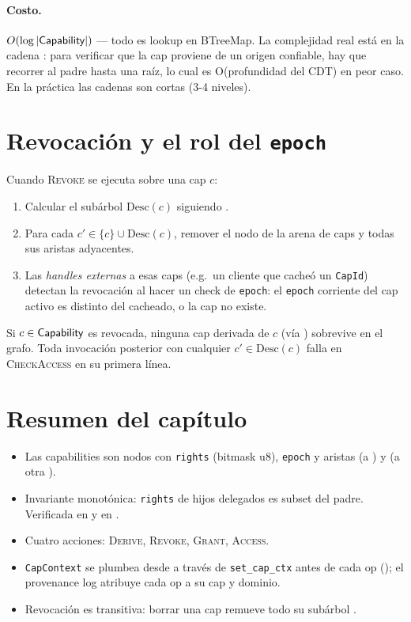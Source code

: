 \paragraph{Costo.} $O(\log |\textsf{Capability}|)$ — todo es lookup en BTreeMap. La
complejidad real está en la cadena \edelegates: para verificar que la
cap proviene de un origen confiable, hay que recorrer al padre hasta una
raíz, lo cual es O(profundidad del CDT) en peor caso. En la práctica
las cadenas son cortas (3-4 niveles).

\section{Revocación y el rol del \texttt{epoch}}

Cuando \textsc{Revoke} se ejecuta sobre una cap $c$:

\begin{enumerate}
  \item Calcular el subárbol $\mathrm{Desc}(c)$ siguiendo \edelegates.
  \item Para cada $c' \in \{c\} \cup \mathrm{Desc}(c)$, remover el nodo
    de la arena de caps y todas sus aristas adyacentes.
  \item Las \emph{handles externas} a esas caps (e.g.\ un cliente que
    cacheó un \texttt{CapId}) detectan la revocación al hacer un check
    de \texttt{epoch}: el \texttt{epoch} corriente del cap activo es
    distinto del cacheado, o la cap no existe.
\end{enumerate}

\begin{lema}
\label{lem:revoke-transitivo}
Si $c \in \textsf{Capability}$ es revocada, ninguna cap derivada de $c$ (vía
\edelegates) sobrevive en el grafo. Toda invocación posterior con
cualquier $c' \in \mathrm{Desc}(c)$ falla en \textsc{CheckAccess} en su
primera línea.
\end{lema}

\section*{Resumen del capítulo}

\begin{itemize}
  \item Las capabilities son nodos \NCap{} con \texttt{rights} (bitmask
    u8), \texttt{epoch} y aristas \egrants{} (a \NInode) y \edelegates{}
    (a otra \NCap).
  \item Invariante monotónica: \texttt{rights} de hijos delegados es
    subset del padre. Verificada en 
    y en .
  \item Cuatro acciones: \textsc{Derive}, \textsc{Revoke},
    \textsc{Grant}, \textsc{Access}.
  \item \texttt{CapContext} se plumbea desde \fuse{} a través de
    \texttt{set\_cap\_ctx} antes de cada op (); el
    provenance log atribuye cada op a su cap y dominio.
  \item Revocación es transitiva: borrar una cap remueve todo su
    subárbol \edelegates.
\end{itemize}

